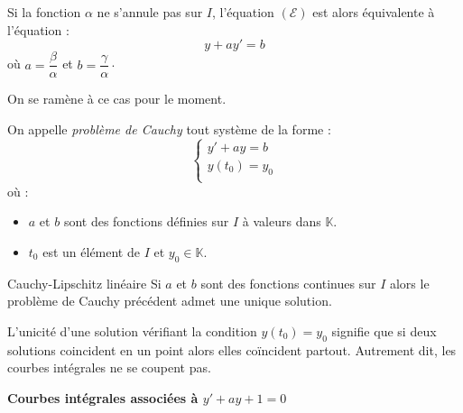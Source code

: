 \documentclass[french,11pt,twoside]{VcCours}
\begin{document}
Si la fonction $\alpha$ ne s'annule pas sur $I$, l'équation $(\mathcal{E})$ est alors équivalente à l'équation :
$$ y+ay'=b$$
où $a = \dfrac{\beta}{\alpha}$ et $b = \dfrac{\gamma}{\alpha} \cdot$

\medskip

On se ramène à ce cas pour le moment.

\begin{Definition}{} On appelle \emph{problème de Cauchy} tout système de la forme :
$$ \left\lbrace \begin{array}{ccl}
y'+ay=b \\
y(t_0)=y_0 \\
\end{array}\right.$$
où :
\begin{itemize}
\item $a$ et $b$ sont des fonctions définies sur $I$ à valeurs dans $\mathbb{K}$.
\item $t_0$ est un élément de $I$ et $y_0 \in \mathbb{K}$.
\end{itemize}
\end{Definition}

\begin{Theoreme}{Cauchy-Lipschitz linéaire} Si $a$ et $b$ sont des fonctions continues sur $I$ alors le problème de Cauchy précédent admet une unique solution.
\end{Theoreme}

\begin{Remarque}{} L'unicité d'une solution vérifiant la condition $y(t_0)=y_0$ signifie que si deux solutions coincident en un point alors elles coïncident partout. Autrement dit, les courbes intégrales ne se coupent pas.
\end{Remarque}

\pagebreak

\begin{center}
\textbf{Courbes intégrales associées à $y'+ay+1=0$ }
\end{center}
\end{document}
